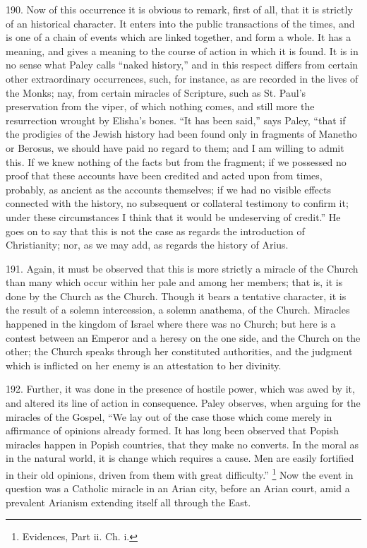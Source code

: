 190.
Now of this occurrence it is obvious to remark, first of all, that it
is strictly of an historical character. It enters into the public
transactions of the times, and is one of a chain of events which are
linked together, and form a whole. It has a meaning, and gives a
meaning to the course of action in which it is found. It is in no
sense what Paley calls ``naked history,'' and in this respect differs
from certain other extraordinary occurrences, such, for
instance, as are recorded in the lives of the Monks; nay, from certain
miracles of Scripture, such as St. Paul's preservation from the viper,
of which nothing comes, and still more the resurrection wrought by
Elisha's bones. ``It has been said,'' says Paley, ``that if the prodigies
of the Jewish history had been found only in fragments of Manetho or
Berosus, we should have paid no regard to them; and I am willing to
admit this. If we knew nothing of the facts but from the fragment; if
we possessed no proof that these accounts have been credited and acted
upon from times, probably, as ancient as the accounts themselves; if
we had no visible effects connected with the history, no subsequent or
collateral testimony to confirm it; under these circumstances I think
that it would be undeserving of credit.'' He goes on to say that this
is not the case as regards the introduction of Christianity; nor, as
we may add, as regards the history of Arius.

191.
Again, it must be observed that this is more strictly a miracle of the
Church than many which occur within her pale and among her members;
that is, it is done by the Church as the Church. Though it bears a
tentative character, it is the result of a solemn intercession, a
solemn anathema, of the Church. Miracles happened in the kingdom of
Israel where there was no Church; but here is a contest between an
Emperor and a heresy on the one side, and the Church on the
other; the Church speaks through her constituted authorities, and the
judgment which is inflicted on her enemy is an attestation to her
divinity.

192.
Further, it was done in the presence of hostile power, which was awed
by it, and altered its line of action in consequence. Paley observes,
when arguing for the miracles of the Gospel, ``We lay out of the case
those which come merely in affirmance of opinions already formed. It
has long been observed that Popish miracles happen in Popish
countries, that they make no converts. In the moral as in the natural
world, it is change which requires a cause. Men are easily fortified
in their old opinions, driven from them with great difficulty.'' \footnote{Evidences, Part ii. Ch. i.} Now the event in question was a Catholic miracle in an Arian
city, before an Arian court, amid a prevalent Arianism extending
itself all through the East.

